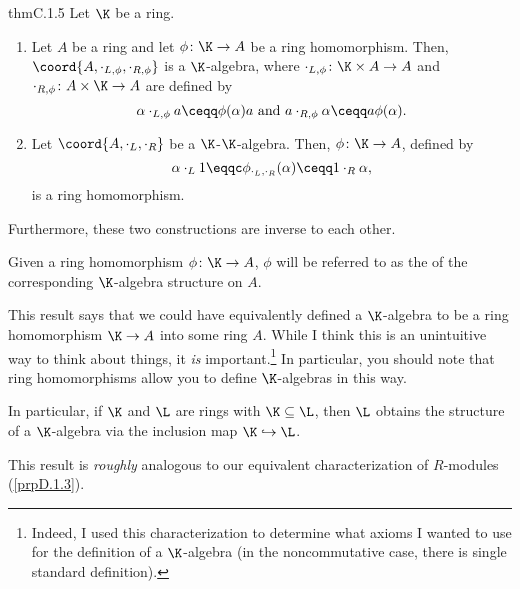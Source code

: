 \begin{thm}{}{thmC.1.5}
	Let $\K$ be a ring.
	\begin{enumerate}
		\item \label{thmC.1.5(i)}Let $A$ be a ring and let $\phi \colon \K \rightarrow A$ be a ring homomorphism.  Then, $\coord{A,\cdot _{L,\phi},\cdot _{R,\phi}}$ is a $\K$-algebra, where $\cdot _{L,\phi}\colon \K \times A\rightarrow A$ and $\cdot _{R,\phi}\colon A\times \K \rightarrow A$ are defined by
		\begin{equation}
			\alpha \cdot _{L,\phi}a\ceqq \phi (\alpha )a\text{ and }a\cdot _{R,\phi}\alpha \ceqq a\phi (\alpha ).
		\end{equation}
		\item \label{thmC.1.5(ii)}Let $\coord{A,\cdot _L,\cdot _R}$ be a $\K$-$\K$-algebra.  Then, $\phi \colon \K \rightarrow A$, defined by
		\begin{equation}
			\alpha \cdot _L1\eqqc \phi _{\cdot _L,\cdot _R}(\alpha )\ceqq 1\cdot _R\alpha ,
		\end{equation}
		is a ring homomorphism.
	\end{enumerate}
	Furthermore, these two constructions are inverse to each other.
	\begin{rmk}
		Given a ring homomorphism $\phi \colon \K \rightarrow A$, $\phi$ will be referred to as the  of the corresponding $\K$-algebra structure on $A$.
	\end{rmk}
	\begin{rmk}
		This result says that we could have equivalently defined a $\K$-algebra to be a ring homomorphism $\K \rightarrow A$ into some ring $A$.  While I think this is an unintuitive way to think about things, it \emph{is} important.\footnote{Indeed, I used this characterization to determine what axioms I wanted to use for the definition of a $\K$-algebra (in the noncommutative case, there is single standard definition).}  In particular, you should note that ring homomorphisms allow you to define $\K$-algebras in this way.
	\end{rmk}
	\begin{rmk}
		In particular, if $\K$ and $\L$ are rings with $\K \subseteq \L$, then $\L$ obtains the structure of a $\K$-algebra via the inclusion map $\K \hookrightarrow \L$.
	\end{rmk}
	\begin{rmk}
		This result is \emph{roughly} analogous to our equivalent characterization of $R$-modules (\cref{prpD.1.3}).

\end{rmk}
\end{thm}
